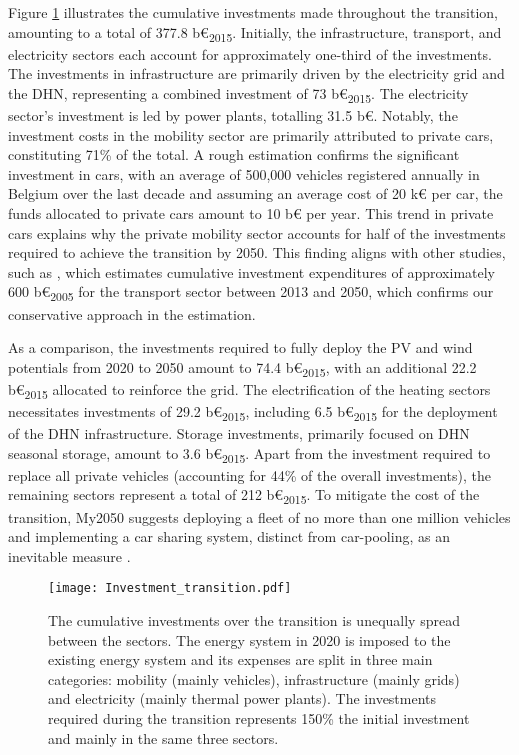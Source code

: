 Figure \ref{fig:pestd_cumul_inv} illustrates the cumulative investments made throughout the transition, amounting to a total of 377.8 b€\textsubscript{2015}. Initially, the infrastructure, transport, and electricity sectors each account for approximately one-third of the investments. The investments in infrastructure are primarily driven by the electricity grid and the \acrfull{DHN}, representing a combined investment of 73 b€\textsubscript{2015}. The electricity sector's investment is led by power plants, totalling 31.5 b€. Notably, the investment costs in the mobility sector are primarily attributed to private cars, constituting 71\% of the total. A rough estimation confirms the significant investment in cars, with an average of 500,000 vehicles registered annually in Belgium over the last decade \cite{febiac2021datadigest} and assuming an average cost of 20 k€ per car, the funds allocated to private cars amount to 10 b€ per year. This trend in private cars explains why the private mobility sector accounts for half of the investments required to achieve the transition by 2050. This finding aligns with other studies, such as \citet{Devogelaer2013}, which estimates cumulative investment expenditures of approximately 600 b€\textsubscript{2005} for the transport sector between 2013 and 2050, which confirms our conservative approach in the estimation.


As a comparison, the investments required to fully deploy the PV and wind potentials from 2020 to 2050 amount to 74.4 b€\textsubscript{2015}, with an additional 22.2 b€\textsubscript{2015} allocated to reinforce the grid. The electrification of the heating sectors necessitates investments of 29.2 b€\textsubscript{2015}, including 6.5 b€\textsubscript{2015} for the deployment of the \gls{DHN} infrastructure. Storage investments, primarily focused on \gls{DHN} seasonal storage, amount to 3.6 b€\textsubscript{2015}. Apart from the investment required to replace all private vehicles (accounting for 44\% of the overall investments), the remaining sectors represent a total of 212 b€\textsubscript{2015}. To mitigate the cost of the transition, My2050 suggests deploying a fleet of no more than one million vehicles and implementing a car sharing system, distinct from car-pooling, as an inevitable measure \cite{My2050}.

\begin{figure}[!htbp]
\centering
\texttt{[image: Investment\_transition.pdf]}
\caption{The cumulative investments over the transition is unequally spread between the sectors. The energy system in 2020 is imposed to the existing energy system and its expenses are split in three main categories: mobility (mainly vehicles), infrastructure (mainly grids) and electricity (mainly thermal power plants). The investments required during the transition represents 150\% the initial investment and mainly in the same three sectors. }
\label{fig:pestd_cumul_inv}
\end{figure}

